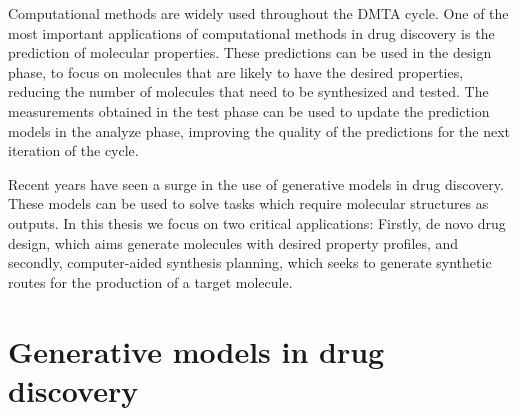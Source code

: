 Computational methods are widely used throughout the DMTA cycle. One of the most important
applications of computational methods in drug discovery is the prediction of molecular properties.
These predictions can be used in the design phase, to focus on molecules that are likely to have the desired
properties, reducing the number of molecules that need to be synthesized and tested. The measurements
obtained in the test phase can be used to update the prediction models in the analyze phase, improving
the quality of the predictions for the next iteration of the cycle.

Recent years have seen a surge in the use of generative models in drug discovery. These models can
be used to solve tasks which require molecular structures as outputs. In this thesis we
focus on two critical applications: Firstly, de novo drug design, which aims generate molecules
with desired property profiles, and secondly, computer-aided synthesis planning, which seeks to
generate synthetic routes for the production of a target molecule.

\section{Generative models in drug discovery}
